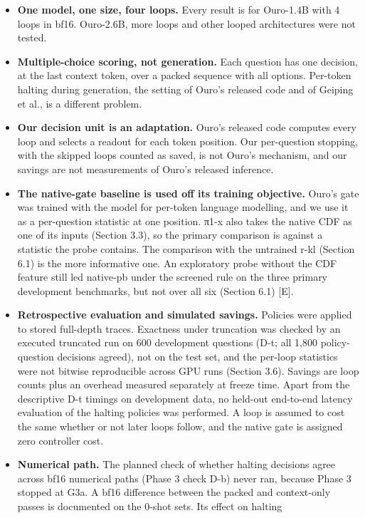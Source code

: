 \begin{itemize}
\tightlist
\item
  \textbf{One model, one size, four loops.} Every result is for Ouro-1.4B with 4 loops in bf16. Ouro-2.6B, more loops and other looped architectures were not tested.
\item
  \textbf{Multiple-choice scoring, not generation.} Each question has one decision, at the last context token, over a packed sequence with all
  options. Per-token halting during generation, the setting of Ouro's released code and of Geiping et al., is a different problem.
\item
  \textbf{Our decision unit is an adaptation.} Ouro's released code computes every loop and selects a readout for each token position. Our
  per-question stopping, with the skipped loops counted as saved, is not Ouro's mechanism, and our savings are not measurements of Ouro's
  released inference.
\item
  \textbf{The native-gate baseline is used off its training objective.} Ouro's gate was trained with the model for per-token language modelling, and we use it as a per-question statistic at one position. π1-x also takes the native CDF as one of its inputs (Section 3.3), so the primary comparison is against a statistic the probe contains. The comparison with the untrained r-kl (Section 6.1) is the more informative one. An exploratory probe without the CDF feature still led native-pb under the screened rule on the three primary development benchmarks, but not over all six (Section 6.1) {[}E{]}.
\item
  \textbf{Retrospective evaluation and simulated savings.} Policies were applied to stored full-depth traces. Exactness under truncation was checked
  by an executed truncated run on 600 development questions (D-t; all 1,800 policy-question decisions agreed), not on the test set, and the per-loop statistics were not bitwise reproducible across GPU runs (Section 3.6). Savings are loop counts plus an overhead measured separately at freeze time.
  Apart from the descriptive D-t timings on development data, no held-out end-to-end latency evaluation of the halting policies was performed. A loop is assumed to cost the same whether or not later loops follow, and the native gate is assigned zero
  controller cost.
\item
  \textbf{Numerical path.} The planned check of whether halting decisions agree across bf16 numerical paths (Phase 3 check D-b) never ran, because
  Phase 3 stopped at G3a. A bf16 difference between the packed and context-only passes is documented on the 0-shot sets. Its effect on halting

\end{itemize}
